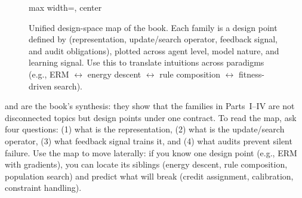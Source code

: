 \begin{figure}[t]
\begin{adjustbox}{max width=\linewidth, center}
    \end{adjustbox}
    \caption[Map of model families]{Unified design\hyp{}space map of the book. Each family is a design point defined by (representation, update/search operator, feedback signal, and audit obligations), plotted across agent level, model nature, and learning signal. Use this to translate intuitions across paradigms (e.g., ERM \(\leftrightarrow\) energy descent \(\leftrightarrow\) rule composition \(\leftrightarrow\) fitness\hyp{}driven search).}
    \label{fig:big-picture-map}
\end{figure}

 and  are the book's synthesis: they show that the families in Parts~I--IV are not disconnected topics but design points under one contract. To read the map, ask four questions: (1) what is the representation, (2) what is the update/search operator, (3) what feedback signal trains it, and (4) what audits prevent silent failure. Use the map to move laterally: if you know one design point (e.g., ERM with gradients), you can locate its siblings (energy descent, rule composition, population search) and predict what will break (credit assignment, calibration, constraint handling).

